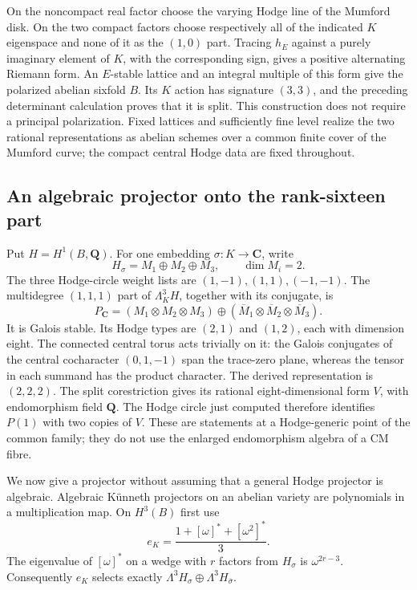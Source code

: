 \documentclass[11pt]{article}
\theoremstyle{definition}
\theoremstyle{remark}
\begin{document}
On the noncompact real factor choose the varying Hodge line of the
Mumford disk.  On the two compact factors choose respectively all of
the indicated $K$ eigenspace and none of it as the $(1,0)$ part.
Tracing $h_E$ against a purely imaginary element of $K$, with the
corresponding sign, gives a positive alternating Riemann form.
An $E$-stable lattice and an integral multiple of this form give the
polarized abelian sixfold $B$.  Its $K$ action has signature $(3,3)$,
and the preceding determinant calculation proves that it is split.
This construction does not require a principal polarization.
Fixed lattices and sufficiently fine level realize the two rational
representations as abelian schemes over a common finite cover of the
Mumford curve; the compact central Hodge data are fixed throughout.

\subsection{An algebraic projector onto the rank-sixteen part}

Put $H=H^1(B,\mathbf Q)$.  For one embedding $\sigma:K\to\mathbf C$,
write
\[
 H_\sigma=M_1\oplus M_2\oplus M_3,\qquad \dim M_i=2.
\]
The three Hodge-circle weight lists are $(1,-1),(1,1),(-1,-1)$.
The multidegree $(1,1,1)$ part of $\Lambda_K^3H$, together with its
conjugate, is
\begin{equation}
 P_{\mathbf C}=(M_1\otimes M_2\otimes M_3)
       \oplus(\overline M_1\otimes\overline M_2\otimes\overline M_3).
 \label{eq:mumford-rank16}
\end{equation}
It is Galois stable.  Its Hodge types are $(2,1)$ and $(1,2)$, each
with dimension eight.  The connected central torus acts trivially on
it: the Galois conjugates of the central cocharacter $(0,1,-1)$ span
the trace-zero plane, whereas the tensor in each summand has the
product character.  The derived representation is $(2,2,2)$.
The split corestriction gives its rational eight-dimensional form
$V$, with endomorphism field $\mathbf Q$.  The Hodge circle just
computed therefore identifies $P(1)$ with two copies of $V$.
These are statements at a Hodge-generic point of the common family;
they do not use the enlarged endomorphism algebra of a CM fibre.

We now give a projector without assuming that a general Hodge
projector is algebraic.  Algebraic K\"unneth projectors on an abelian
variety are polynomials in a multiplication map.  On $H^3(B)$ first use
\[
 e_K=\frac{1+[\omega]^*+[\omega^2]^*}{3}.
\]
The eigenvalue of $[\omega]^*$ on a wedge with $r$ factors from
$H_\sigma$ is $\omega^{2r-3}$.  Consequently $e_K$ selects exactly
$\Lambda^3H_\sigma\oplus\Lambda^3H_{\bar\sigma}$.
\end{document}
